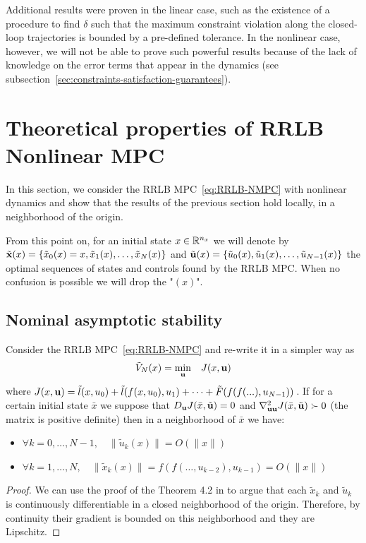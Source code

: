 \documentclass[12pt]{article}
\begin{document}
\noindent Additional results were proven in the linear case, such as the existence of a procedure to find $\delta$ such that the maximum constraint violation along the closed-loop trajectories is bounded by a pre-defined tolerance.
In the nonlinear case, however, we will not be able to prove such powerful results because of the lack of knowledge on the error terms that appear in the dynamics (see subsection~\ref{sec:constraints-satisfaction-guarantees}).

\section{Theoretical properties of RRLB Nonlinear MPC}\label{sec:RRLB-theoretical-properties}

In this section, we consider the RRLB MPC~\ref{eq:RRLB-NMPC} with nonlinear dynamics and show that the results of the previous section hold locally, in a neighborhood of the origin.

From this point on, for an initial state $x\in\R^{n_x}$ we will denote by \newline
$\tilde{\bf{x}}(x)=\left\{ \tilde{x}_0(x)=x,\tilde{x}_1(x),\ldots,\tilde{x}_N(x) \right\}$ and $\tilde{\bf{u}}(x)=\left\{ \tilde{u}_0(x),\tilde{u}_1(x),\ldots,\tilde{u}_{N-1}(x) \right\}$ the optimal sequences of states and controls found by the RRLB MPC.
When no confusion is possible we will drop the "$(x)$".

\subsection{Nominal asymptotic stability}\label{sec:RRLB-nominal-stability}

\begin{lemma}
	\label{thm:Lipschitzianity}
	Consider the RRLB MPC~\ref{eq:RRLB-NMPC} and re-write it in a simpler way as
	$$\tilde{V}_N(x)=\underset{\bf{u}}{\min} \quad J(x,\bf{u})$$
	where $J(x,\bf{u})=\tilde{l}(x,u_0)+\tilde{l}(f(x,u_0),u_1)+\cdots+\tilde{F}(f(f(...),u_{N-1}))$\,.
	If for a certain initial state $\bar{x}$ we suppose that $D_\bf{u}J(\bar{x},\tilde{\bf{u}})=0$ and $\nabla_{\bf{u}\bf{u}}^2J(\bar{x}, \tilde{\bf{u}})\succ 0$ (the matrix is positive definite) then in a neighborhood of $\bar{x}$ we have:
	\begin{itemize}[label=\textbullet]
		\item $\forall k=0,\ldots,N-1,\quad \|\tilde{u}_k(x)\|=O(\|x\|)$
		\item $\forall k=1,\ldots,N,\quad \|\tilde{x}_k(x)\|=f(f(\ldots,u_{k-2}),u_{k-1})=O(\|x\|)$
	\end{itemize}
\end{lemma}
\begin{proof}
	We can use the proof of the Theorem 4.2 in \cite{lectures-parametric-optimization} to argue that each $\tilde{x}_k$ and $\tilde{u}_k$ is continuously differentiable in a closed neighborhood of the origin.
	Therefore, by continuity their gradient is bounded on this neighborhood and they are Lipschitz.
\end{proof}
\end{document}

